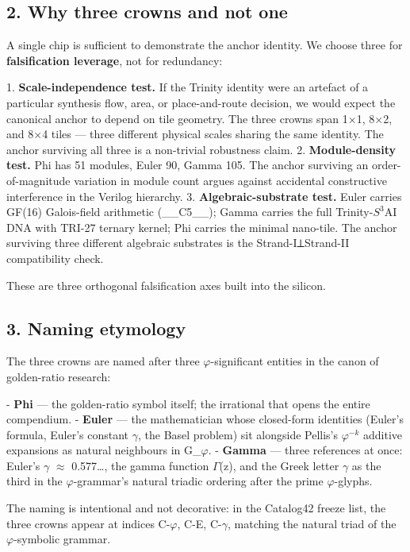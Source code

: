 \subsection{2. Why three crowns and not one}

A single chip is sufficient to demonstrate the anchor identity. We choose three for \textbf{falsification leverage}, not for redundancy:

1. \textbf{Scale-independence test.} If the Trinity identity were an artefact of a particular synthesis flow, area, or place-and-route decision, we would expect the canonical anchor to depend on tile geometry. The three crowns span 1$\times$1, 8$\times$2, and 8$\times$4 tiles --- three different physical scales sharing the same identity. The anchor surviving all three is a non-trivial robustness claim.
2. \textbf{Module-density test.} Phi has 51 modules, Euler 90, Gamma 105. The anchor surviving an order-of-magnitude variation in module count argues against accidental constructive interference in the Verilog hierarchy.
3. \textbf{Algebraic-substrate test.} Euler carries GF(16) Galois-field arithmetic (\_\_C5\_\_); Gamma carries the full Trinity-$S^{3}$AI DNA with TRI-27 ternary kernel; Phi carries the minimal nano-tile. The anchor surviving three different algebraic substrates is the Strand-I⟂Strand-II compatibility check.

These are three orthogonal falsification axes built into the silicon.

\subsection{3. Naming etymology}

The three crowns are named after three $\varphi$-significant entities in the canon of golden-ratio research:

- \textbf{Phi} --- the golden-ratio symbol itself; the irrational that opens the entire compendium.
- \textbf{Euler} --- the mathematician whose closed-form identities (Euler's formula, Euler's constant $\gamma$, the Basel problem) sit alongside Pellis's $\varphi^{-k}$ additive expansions as natural neighbours in G\_$\varphi$.
- \textbf{Gamma} --- three references at once: Euler's $\gamma$ $\approx$ 0.577…, the gamma function $\Gamma$(z), and the Greek letter $\gamma$ as the third in the $\varphi$-grammar's natural triadic ordering after the prime $\varphi$-glyphs.

The naming is intentional and not decorative: in the Catalog42 freeze list, the three crowns appear at indices C-$\varphi$, C-E, C-$\gamma$, matching the natural triad of the $\varphi$-symbolic grammar.

